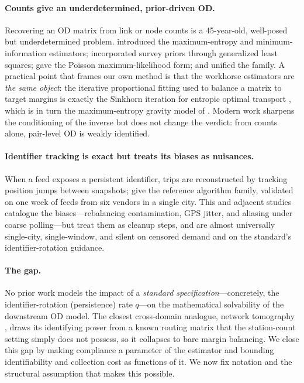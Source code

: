 \paragraph{Counts give an underdetermined, prior-driven OD.}
Recovering an OD matrix from link or node counts is a 45-year-old, well-posed
but underdetermined problem. \citet{VanZuylenWillumsen1980} introduced the
maximum-entropy and minimum-information estimators; \citet{Cascetta1984}
incorporated survey priors through generalized least squares;
\citet{Spiess1987} gave the Poisson maximum-likelihood form; and
\citet{CascettaNguyen1988} unified the family. A practical point that frames
our own method is that the workhorse estimators are \emph{the same object}: the
iterative proportional fitting used to balance a matrix to target margins is
exactly the Sinkhorn iteration for entropic optimal transport
\citep{Sinkhorn1964,Cuturi2013,PeyreCuturi2019}, which is in turn the
maximum-entropy gravity model of \citet{Wilson1967}. Modern work sharpens the
conditioning of the inverse \citep{MaQian2023} but does not change the verdict:
from counts alone, pair-level OD is weakly identified.

\paragraph{Identifier tracking is exact but treats its biases as nuisances.}
When a feed exposes a persistent identifier, trips are reconstructed by tracking
position jumps between snapshots; \citet{Xu2022} give the reference algorithm
family, validated on one week of feeds from six vendors in a single city. This
and adjacent studies catalogue the biases---rebalancing contamination, GPS
jitter, and aliasing under coarse polling---but treat them as cleanup steps, and
are almost universally single-city, single-window, and silent on censored
demand \citep{RudloffLackner2014,Negahban2019,Goh2019} and on the standard's
identifier-rotation guidance.

\paragraph{The gap.}
No prior work models the impact of a \emph{standard specification}---concretely,
the identifier-rotation (persistence) rate $q$---on the mathematical solvability
of the downstream OD model. The closest cross-domain analogue, network
tomography \citep{Vardi1996}, draws its identifying power from a known routing
matrix that the station-count setting simply does not possess, so it collapses
to bare margin balancing. We close this gap by making compliance a parameter of
the estimator and bounding identifiability and collection cost as functions of
it. We now fix notation and the structural assumption that makes this possible.


